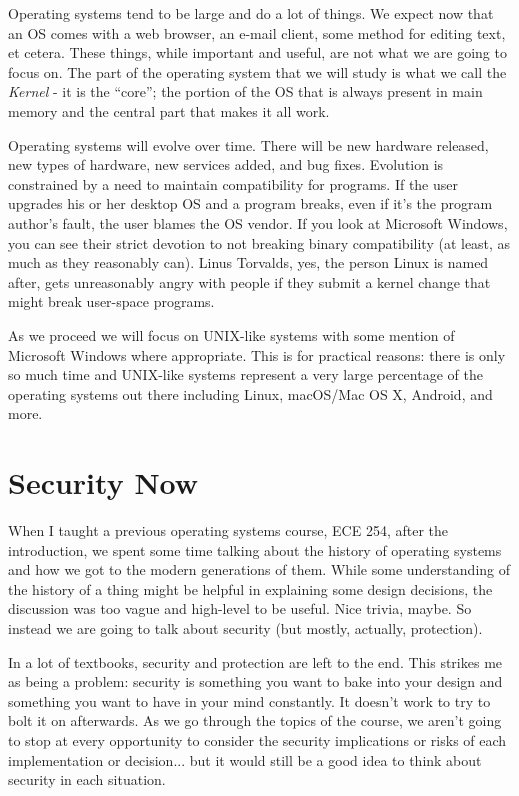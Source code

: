 Operating systems tend to be large and do a lot of things. We expect now that an OS comes with a web browser, an e-mail client, some method for editing text, et cetera. These things, while important and useful, are not what we are going to focus on. The part of the operating system that we will study is what we call the \textit{Kernel} - it is the ``core''; the portion of the OS that is always present in main memory and the central part that makes it all work.

Operating systems will evolve over time. There will be new hardware released, new types of hardware, new services added, and bug fixes. Evolution is constrained by a need to maintain compatibility for programs. If the user upgrades his or her desktop OS and a program breaks, even if it's the program author's fault, the user blames the OS vendor. If you look at Microsoft Windows, you can see their strict devotion to not breaking binary compatibility (at least, as much as they reasonably can). Linus Torvalds, yes, the person Linux is named after, gets unreasonably angry with people if they submit a kernel change that might break user-space programs. 

As we proceed we will focus on UNIX-like systems with some mention of Microsoft Windows where appropriate. This is for practical reasons: there is only so much time and UNIX-like systems represent a very large percentage of the operating systems out there including Linux, macOS/Mac OS X, Android, and more.

\section*{Security Now}
When I taught a previous operating systems course, ECE 254, after the introduction, we spent some time talking about the history of operating systems and how we got to the modern generations of them. While some understanding of the history of a thing might be helpful in explaining some design decisions, the discussion was too vague and high-level to be useful. Nice trivia, maybe. So instead we are going to talk about security (but mostly, actually, protection).

In a lot of textbooks, security and protection are left to the end. This strikes me as being a problem: security is something you want to bake into your design and something you want to have in your mind constantly. It doesn't work to try to bolt it on afterwards. As we go through the topics of the course, we aren't going to stop at every opportunity to consider the security implications or risks of each implementation or decision... but it would still be a good idea to think about security in each situation.

